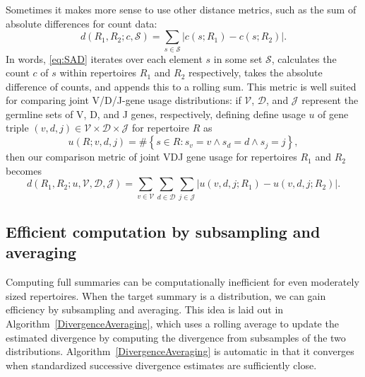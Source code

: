 \documentclass{article}
\begin{document}
Sometimes it makes more sense to use other distance metrics, such as the sum of absolute differences for count data:
\begin{equation}\label{eq:SAD}
    d(R_1, R_2; c, \mathcal S) = \sum_{s \in \mathcal S} \left| c(s; R_1) - c(s; R_2) \right|.
\end{equation}
In words, \eqref{eq:SAD} iterates over each element $s$ in some set $\mathcal S$, calculates the count $c$ of $s$ within repertoires $R_1$ and $R_2$ respectively, takes the absolute difference of counts, and appends this to a rolling sum.
This metric is well suited for comparing joint V/D/J-gene usage distributions:
if $\mathcal V$, $\mathcal D$, and $\mathcal J$ represent the germline sets of V, D, and J genes, respectively,
defining define usage $u$ of gene triple $(v, d, j) \in \mathcal V \times \mathcal D \times \mathcal J$ for repertoire $R$ as
\begin{equation}
u(R; v, d, j) = \#\left\{s \in R: s_v = v \land s_d = d \land s_j = j\right\},
\end{equation}
then our comparison metric of joint VDJ gene usage for repertoires $R_1$ and $R_2$ becomes
\begin{equation}
d(R_1, R_2; u, \mathcal V, \mathcal D, \mathcal J) = \sum_{v \in \mathcal V} \sum_{d \in \mathcal D} \sum_{j \in \mathcal J} \left| u(v, d, j; R_1) - u(v, d, j; R_2) \right|.
\end{equation}

\subsection*{Efficient computation by subsampling and averaging}
Computing full summaries can be computationally inefficient for even moderately sized repertoires.
When the target summary is a distribution, we can gain efficiency by subsampling and averaging.
This idea is laid out in Algorithm~\ref{DivergenceAveraging}, which uses a rolling average to update the estimated divergence by computing the divergence from subsamples of the two distributions.
Algorithm~\ref{DivergenceAveraging} is automatic in that it converges when standardized successive divergence estimates are sufficiently close.
\end{document}
